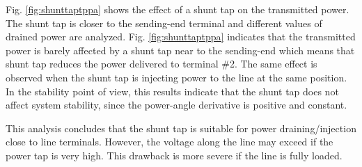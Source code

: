 \documentclass[12pt,a4paper]{reportmod}
\begin{document}
\par Fig. \ref{fig:shunttaptppa} shows the effect of a shunt tap on the transmitted power. The shunt tap is closer to the sending-end terminal and different values of drained power are analyzed. Fig. \ref{fig:shunttaptppa} indicates that the transmitted power is barely affected by a shunt tap near to the sending-end which means that shunt tap reduces the power delivered to terminal \#2. The same effect is observed when the shunt tap is injecting power to the line at the same position. In the stability point of view, this results indicate that the shunt tap does not affect system stability, since the power-angle derivative is positive and constant.
\par This analysis concludes that the shunt tap is suitable for power draining/injection close to line terminals. However, the voltage along the line may exceed if the power tap is very high. This drawback is more severe if the line is fully loaded.
\end{document}
